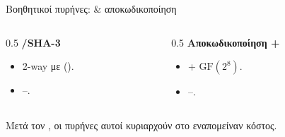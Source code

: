 \begin{frame}{Βοηθητικοί πυρήνες:  \& αποκωδικοποίηση}
  \begin{columns}[T]
    \begin{column}{0.5\textwidth}
      \textbf{/SHA-3}
      \begin{itemize}
        \item 2-way  με \Zvbb (\vror).
        \item {}–.
      \end{itemize}
    \end{column}
    \begin{column}{0.5\textwidth}
      \textbf{Αποκωδικοποίηση +}
      \begin{itemize}
        \item \RVV + \Zvbc $\mathrm{GF}(2^8)$.
        \item {}–.
      \end{itemize}
    \end{column}
  \end{columns}
  \vspace{0.4em}
  \begin{center}\footnotesize Μετά τον , οι πυρήνες αυτοί κυριαρχούν στο εναπομείναν κόστος.\end{center}
\end{frame}
